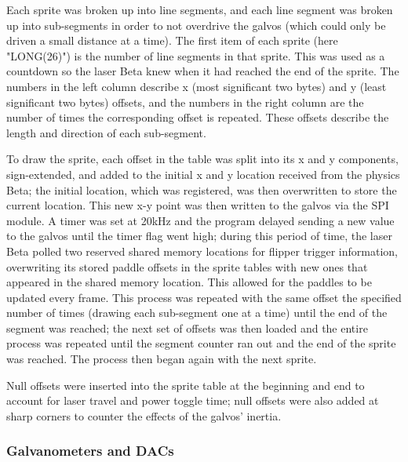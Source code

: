 \documentclass{article}
\begin{document}
Each sprite was broken up into line segments, and each line segment was broken up into sub-segments in order to not overdrive the galvos (which could only be driven a small distance at a time). The first item of each sprite (here "LONG(26)") is the number of line segments in that sprite. This was used as a countdown so the laser Beta knew when it had reached the end of the sprite. The numbers in the left column describe x (most significant two bytes) and y (least significant two bytes) offsets, and the numbers in the right column are the number of times the corresponding offset is repeated. These offsets describe the length and direction of each sub-segment.

 To draw the sprite, each offset in the table was split into its x and y components, sign-extended, and added to the initial x and y location received from the physics Beta; the initial location, which was registered, was then overwritten to store the current location. This new x-y point was then written to the galvos via the SPI module. A timer was set at 20kHz and the program delayed sending a new value to the galvos until the timer flag went high; during this period of time, the laser Beta polled two reserved shared memory locations for flipper trigger information, overwriting its stored paddle offsets in the sprite tables with new ones that appeared in the shared memory location. This allowed for the paddles to be updated every frame. This process was repeated with the same offset the specified number of times (drawing each sub-segment one at a time) until the end of the segment was reached; the next set of offsets was then loaded and the entire process was repeated until the segment counter ran out and the end of the sprite was reached. The process then began again with the next sprite.
 
Null offsets were inserted into the sprite table at the beginning and end to account for laser travel and power toggle time; null offsets were also added at sharp corners to counter the effects of the galvos' inertia.

\subsubsection{Galvanometers and DACs} \label{galvos}
\end{document}
